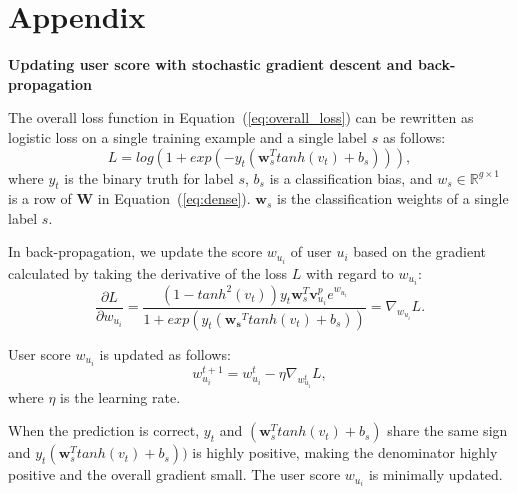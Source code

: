 \documentclass{bmcart}
\begin{document}
\section*{Appendix}
{\bf Updating user score with stochastic gradient descent and back-propagation}

The overall loss function in Equation~(\ref{eq:overall_loss}) can be rewritten as logistic loss on a single training example and a single label $s$ as follows: 
\begin{equation}
    L = log(1+exp(-y_t(\boldsymbol{w}_{s}^T tanh(v_t)+b_s))), 
\end{equation}
where $y_t$ is the binary truth for label $s$, $b_s$ is a classification bias, and $w_s\in \mathbb{R}^{g\times1}$ is a row of $\boldsymbol{W}$ in Equation~(\ref{eq:dense}). $\boldsymbol{w}_{s}$ is the classification weights of a single label $s$.

In back-propagation, we update the score $w_{u_i}$ of user $u_i$ based on the gradient calculated by taking the derivative of the loss $L$ 
with regard to $w_{u_i}$:
\begin{equation}
    \frac{\partial L}{\partial w_{u_i}} = \frac{(1-tanh^2(v_t)){y_t}\boldsymbol{w}_{s}^T \boldsymbol{v}^{p}_{u_i}e^{w_{u_i}}}{1+exp(y_t(\boldsymbol{w_s}^T tanh(v_t)+b_s))}=\nabla_{w_{u_i}}L.
\end{equation}

User score $w_{u_i}$ is updated as follows: 
\begin{equation}
    w^{t+1}_{u_i} = w^{t}_{u_i} - \eta\nabla_{w^{t}_{u_i}}L,
\end{equation}
where $\eta$ is the learning rate.

When the prediction is correct, $y_t$ and $(\boldsymbol{w}_{s}^T tanh(v_t)+b_s)$ share the same sign and $y_t(\boldsymbol{w}_{s}^T tanh(v_t)+b_s))$ is highly positive, making the denominator highly positive and the overall gradient small. The user score $w_{u_i}$ is minimally updated.
\end{document}
